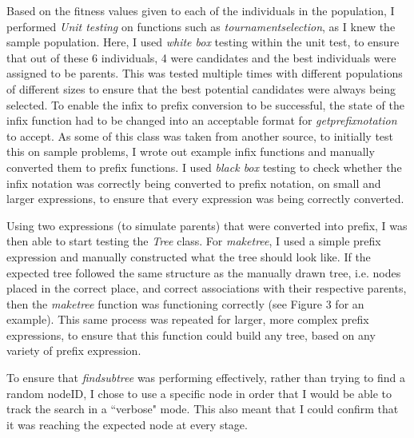 \documentclass[11pt]{article}
\begin{document}
Based on the fitness values given to each of the individuals in the population, I performed \textit{Unit testing} on functions such as \textit{tournament\textunderscore selection}, as I knew the sample population. Here, I used \textit{white box} testing within the unit test, to ensure that out of these 6 individuals, 4 were candidates and the best individuals were assigned to be parents. This was tested multiple times with different populations of different sizes to ensure that the best potential candidates were always being selected. 
To enable the infix to prefix conversion to be successful, the state of the infix function had to be changed into an acceptable format for \textit{get\textunderscore prefix\textunderscore notation} to accept. As some of this class was taken from another source, to initially test this on sample problems, I wrote out example infix functions and manually converted them to prefix functions. I used \textit{black box} testing to check whether the infix notation was correctly being converted to prefix notation, on small and larger expressions, to ensure that every expression was being correctly converted. 

Using two expressions (to simulate parents) that were converted into prefix, I was then able to start testing the \textit{Tree} class. For \textit{make\textunderscore tree}, I used a simple prefix expression
and manually constructed what the tree should look like. If the expected tree followed the same structure as the manually drawn tree, i.e. nodes placed in the correct place, and correct associations with their respective parents, then the \textit{make\textunderscore tree} function was functioning correctly (see Figure 3 for an example).  This same process was repeated for larger, more complex prefix expressions, to ensure that this function could build any tree, based on any variety of prefix expression.  

To ensure that \textit{find\textunderscore subtree} was performing effectively, rather than trying to find a random nodeID, I chose to use a specific node in order that I would be able to track the search in a ``verbose" mode. This also meant that I could confirm that it was reaching the expected node at every stage.
\end{document}
